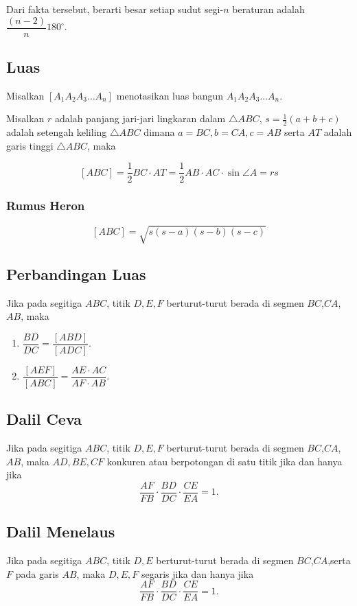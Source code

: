 \documentclass[11pt]{scrartcl}
\begin{document}
    Dari fakta tersebut, berarti besar setiap sudut segi-$n$ beraturan adalah $\dfrac{(n-2)}{n}180^\circ$.
    
    \subsection{Luas}
    Misalkan $[A_1A_2A_3\dots A_n]$ menotasikan luas bangun $A_1A_2A_3\dots A_n$. 
    
    Misalkan $r$ adalah panjang jari-jari lingkaran dalam $\triangle ABC$, $s=\frac{1}{2}(a+b+c)$ adalah setengah keliling $\triangle ABC$ dimana $a=BC, b=CA, c=AB$ serta $AT$ adalah garis tinggi $\triangle ABC$, maka
    
    $$[ABC]  = \dfrac{1}{2}BC \cdot AT = \dfrac{1}{2}AB\cdot AC \cdot \sin \angle A = rs$$
    
    \subsubsection{Rumus Heron}
    $$[ABC]  = \sqrt{s(s-a)(s-b)(s-c)}$$
    
    \subsection{Perbandingan Luas}
    Jika pada segitiga $ABC$, titik $D,E,F$ berturut-turut berada di segmen $BC$,$CA$,$AB$, maka 
    \begin{enumerate}
        \item $\dfrac{BD}{DC} = \dfrac{[ABD]}{[ADC]}.$
        \item $\dfrac{[AEF]}{[ABC]}=\dfrac{AE \cdot AC}{AF \cdot AB}.$
    \end{enumerate}
    
    \subsection{Dalil Ceva}
    Jika pada segitiga $ABC$, titik $D,E,F$ berturut-turut berada di segmen $BC$,$CA$,$AB$, maka 
    $AD,BE,CF$ konkuren atau berpotongan di satu titik jika dan hanya jika $$\dfrac{AF}{FB} \cdot \dfrac{BD}{DC} \cdot \dfrac{CE}{EA} = 1.$$
    
    \subsection{Dalil Menelaus}
    Jika pada segitiga $ABC$, titik $D,E$ berturut-turut berada di segmen $BC$,$CA$,serta $F$ pada garis $AB$, maka $D,E,F$ segaris jika dan hanya jika
    $$\dfrac{AF}{FB} \cdot \dfrac{BD}{DC} \cdot \dfrac{CE}{EA} = 1.$$
    
\end{document}
